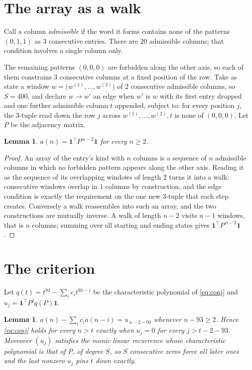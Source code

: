 \documentclass[11pt,a4paper]{article}
\theoremstyle{plain}
\newtheorem{lemma}[theorem]{Lemma}
\theoremstyle{definition}
\begin{document}
\section{The array as a walk}

Call a column \emph{admissible} if the word it forms contains none of the patterns
$(0,1,1)$ as $3$ consecutive entries. There are $20$ admissible columns; that condition
involves a single column only.

The remaining patterns $(0,0,0)$ are forbidden along the other axis, so each of them
constrains $3$ consecutive columns at a fixed position of the row. Take as state a
window $w=\bigl(w^{(1)},\dots,w^{(2)}\bigr)$ of $2$ consecutive admissible
columns, so $S=400$, and declare $w\to w'$ an edge when $w'$ is $w$ with its first entry
dropped and one further admissible column $t$ appended, subject to: for every position
$j$, the $3$-tuple read down the row $j$ across $w^{(1)},\dots,w^{(2)},t$
is none of $(0,0,0)$. Let $P$ be the adjacency matrix.

\begin{lemma}\label{lem:walk}
$a(n)=\mathbf{1}^{\!\top}P^{\,n-2}\mathbf{1}$ for every $n\ge2$.
\end{lemma}

\begin{proof}
An array of the entry's kind with $n$ columns is a sequence of $n$ admissible columns in
which no forbidden pattern appears along the other axis. Reading it as the sequence of its
overlapping windows of length $2$ turns it into a walk: consecutive windows overlap in
$1$ columns by construction, and the edge condition is exactly the requirement on the one
new $3$-tuple that each step creates. Conversely a walk reassembles into such an array,
and the two constructions are mutually inverse. A walk of length $n-2$ visits $n-1$
windows, that is $n$ columns; summing over all starting and ending states gives
$\mathbf{1}^{\!\top}P^{\,n-2}\mathbf{1}$.
\end{proof}

\section{The criterion}

Let $q(t)=t^{93}-\sum_i c_i t^{93-i}$ be the characteristic polynomial of
\eqref{eq:conj} and $u_j=\mathbf{1}^{\!\top}P^{j}q(P)\mathbf{1}$.

\begin{lemma}\label{lem:crit}
$a(n)-\sum_i c_i a(n-i)=u_{\,n-2-93}$ whenever $n-93\ge2$. Hence
\eqref{eq:conj} holds for every $n>t$ exactly when $u_j=0$ for every
$j>t-2-93$. Moreover $(u_j)$ satisfies the monic linear recurrence whose
characteristic polynomial is that of $P$, of degree $S$, so $S$ consecutive zeros force all
later ones and the last nonzero $u_j$ pins $t$ down exactly.
\end{lemma}
\end{document}
